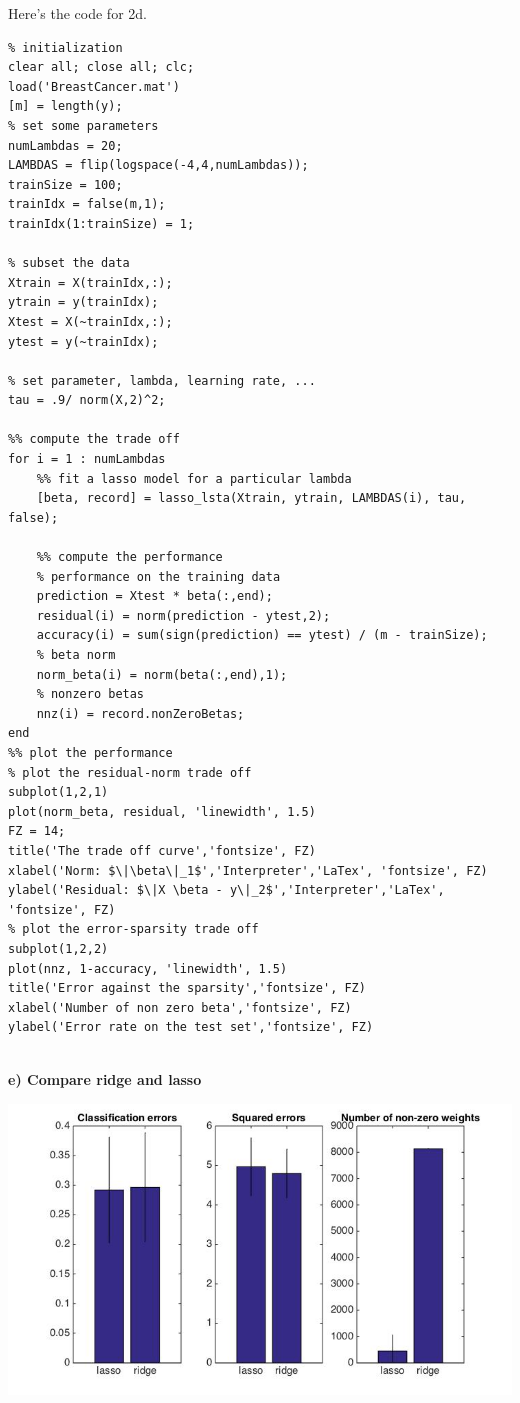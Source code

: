 \documentclass[paper=a4, fontsize=11pt]{scrartcl} %
\numberwithin{equation}{section} %
\numberwithin{figure}{section} %
\numberwithin{table}{section} %
\begin{document}
\newpage
Here's the code for 2d. 
\begin{lstlisting}
% initialization
clear all; close all; clc;
load('BreastCancer.mat')
[m] = length(y);
% set some parameters
numLambdas = 20;
LAMBDAS = flip(logspace(-4,4,numLambdas));
trainSize = 100;
trainIdx = false(m,1);
trainIdx(1:trainSize) = 1;

% subset the data
Xtrain = X(trainIdx,:);
ytrain = y(trainIdx);
Xtest = X(~trainIdx,:);
ytest = y(~trainIdx);

% set parameter, lambda, learning rate, ...
tau = .9/ norm(X,2)^2;

%% compute the trade off
for i = 1 : numLambdas
    %% fit a lasso model for a particular lambda
    [beta, record] = lasso_lsta(Xtrain, ytrain, LAMBDAS(i), tau, false);
    
    %% compute the performance
    % performance on the training data
    prediction = Xtest * beta(:,end);
    residual(i) = norm(prediction - ytest,2);
    accuracy(i) = sum(sign(prediction) == ytest) / (m - trainSize);
    % beta norm 
    norm_beta(i) = norm(beta(:,end),1);
    % nonzero betas
    nnz(i) = record.nonZeroBetas;
end
%% plot the performance 
% plot the residual-norm trade off 
subplot(1,2,1)
plot(norm_beta, residual, 'linewidth', 1.5)
FZ = 14;
title('The trade off curve','fontsize', FZ)
xlabel('Norm: $\|\beta\|_1$','Interpreter','LaTex', 'fontsize', FZ)
ylabel('Residual: $\|X \beta - y\|_2$','Interpreter','LaTex', 'fontsize', FZ)
% plot the error-sparsity trade off 
subplot(1,2,2)
plot(nnz, 1-accuracy, 'linewidth', 1.5)
title('Error against the sparsity','fontsize', FZ)
xlabel('Number of non zero beta','fontsize', FZ)
ylabel('Error rate on the test set','fontsize', FZ)


\end{lstlisting}






\newpage
\textbf{e) Compare ridge and lasso}

\begin{center}
\includegraphics[scale=.5]{hw6_2e_comparel1l2.jpg}
\end{center}
\end{document}
